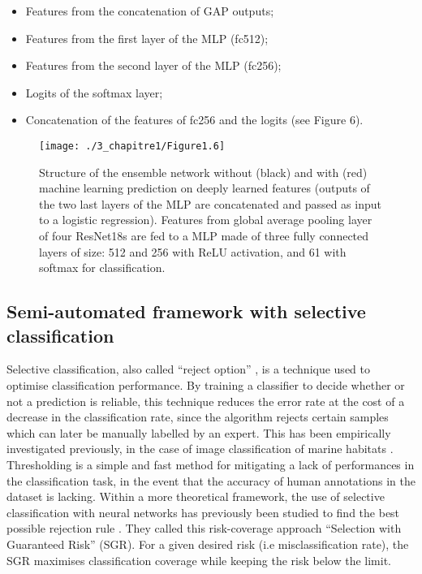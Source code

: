 \begin{itemize}
    \item Features from the concatenation of GAP outputs; 
    \item Features from the first layer of the MLP (fc512);
    \item Features from the second layer of the MLP (fc256);
    \item Logits of the softmax layer;
    \item Concatenation of the features of fc256 and the logits (see Figure 6). 
    
\end{itemize}

\begin{figure}[H]
	\begin{center}
	\texttt{[image: ./3\_chapitre1/Figure1.6]}
		\caption[Structure of the ensemble network]{Structure of the ensemble network without (black) and with (red) machine learning prediction on deeply learned features (outputs of the two last layers of the MLP are concatenated and passed as input to a logistic regression). Features from global average pooling layer of four ResNet18s are fed to a MLP made of three fully connected layers of size: 512 and 256 with ReLU activation, and 61 with softmax for classification.}
	\label{figure1.6}
\end{center}
\end{figure}

\subsection{Semi-automated framework with selective classification}\label{chapitre1_4.4}
Selective classification, also called “reject option” \citep{herbei_classification_2006}, is a technique used to optimise classification performance. By training a classifier to decide whether or not a prediction is reliable, this technique reduces the error rate at the cost of a decrease in the classification rate, since the algorithm rejects certain samples which can later be manually labelled by an expert. This has been empirically investigated previously, in the case of image classification of marine habitats \citep{beijbom_automated_2012, beijbom_towards_2015}. Thresholding is a simple and fast method for mitigating a lack of performances in the classification task, in the event that the accuracy of human annotations in the dataset is lacking. Within a more theoretical framework, the use of selective classification with neural networks has previously been studied to find the best possible rejection rule \citep{geifman_selective_2017}. They called this risk-coverage approach “Selection with Guaranteed Risk” (SGR). For a given desired risk (i.e misclassification rate), the SGR maximises classification coverage while keeping the risk below the limit. 

